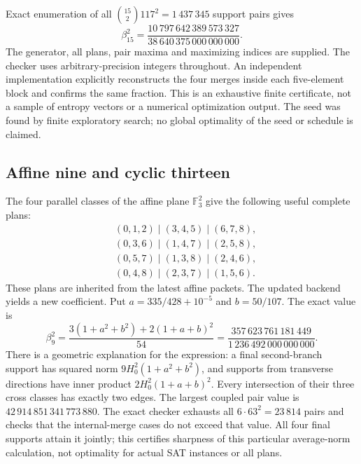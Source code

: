 Exact enumeration of all
$\binom{15}{2}117^2=1\,437\,345$ support pairs gives
\begin{equation}\label{eq:beta15}
 \boxed{\beta_{15}^2=
   \frac{10\,797\,642\,389\,573\,327}{38\,640\,375\,000\,000\,000}}.
\end{equation}
The generator, all plans, pair maxima and maximizing indices are supplied.
The checker uses arbitrary-precision integers throughout. An independent
implementation explicitly reconstructs the four merges inside each
five-element block and confirms the same fraction. This is an exhaustive
finite certificate, not a sample of entropy vectors or a numerical
optimization output. The seed was found by finite exploratory search;
no global optimality of the seed or schedule is claimed.

\subsection{Affine nine and cyclic thirteen}

The four parallel classes of the affine plane $\mathbb F_3^2$ give the
following useful complete plans:
\[
\begin{split}
 &(0,1,2)\mid(3,4,5)\mid(6,7,8),\\
 &(0,3,6)\mid(1,4,7)\mid(2,5,8),\\
 &(0,5,7)\mid(1,3,8)\mid(2,4,6),\\
 &(0,4,8)\mid(2,3,7)\mid(1,5,6).
\end{split}
\]
These plans are inherited from the latest affine packets. The updated
backend yields a new coefficient. Put
$a=335/428+10^{-5}$ and $b=50/107$. The exact value is
\begin{equation}\label{eq:beta9}
 \beta_9^2=
 \frac{3(1+a^2+b^2)+2(1+a+b)^2}{54}
 =\frac{357\,623\,761\,181\,449}{1\,236\,492\,000\,000\,000}.
\end{equation}
There is a geometric explanation for the expression: a final second-branch
support has squared norm $9H_0^2(1+a^2+b^2)$, and supports from transverse
directions have inner product $2H_0^2(1+a+b)^2$. Every intersection of
their three cross classes has exactly two edges. The largest coupled pair
value is $42\,914\,851\,341\,773\,880$. The exact checker exhausts
all $6\cdot63^2=23\,814$ pairs and checks that the internal-merge cases
do not exceed that value. All four final supports attain it jointly;
this certifies sharpness of this particular average-norm calculation,
not optimality for actual SAT instances or all plans.

